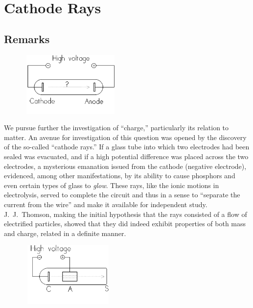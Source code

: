 \chapter{Cathode Rays}



\renewcommand{\theequation}{\arabic{equation}}

\section*{Remarks}

\begin{figure}
  \begin{center}
    \includegraphics[width=2in,height=1.26042in]{images/02_thomson/image001.png}
  \end{center}
\end{figure}

\indent

We pursue
further the investigation of ``charge,'' particularly its relation to
matter. An avenue for investigation of this question was opened by the
discovery of the so-called ``cathode rays.'' If a glass tube into which
two electrodes had been sealed was evacuated, and if a high potential
difference was placed across the two electrodes, a mysterious emanation
issued from the cathode (negative electrode), evidenced, among other
manifestations, by its ability to cause phosphors and even certain types
of glass to \emph{glow}. These rays, like the ionic motions in
electrolysis, served to complete the circuit and thus in a sense to
``separate the current from the wire'' and make it available for
independent study. J.\ J.\ Thomson, making the initial hypothesis that the
rays consisted of a flow of electrified particles, showed that they did
indeed exhibit properties of both mass and charge, related in a definite
manner.
\begin{figure}
  \begin{center}
    \includegraphics[width=1.9in,height=1.26042in]{images/02_thomson/image003.png}
  \end{center}
\end{figure}

